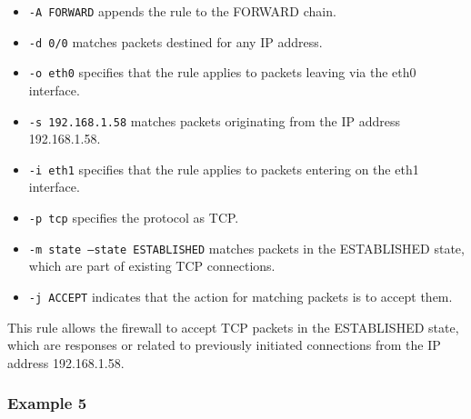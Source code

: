 {{		\begin{itemize}
			\item \texttt{-A FORWARD} appends the rule to the FORWARD chain.
			\item \texttt{-d 0/0} matches packets destined for any IP address.
			\item \texttt{-o eth0} specifies that the rule applies to packets leaving via the eth0 interface.
			\item \texttt{-s 192.168.1.58} matches packets originating from the IP address 192.168.1.58.
			\item \texttt{-i eth1} specifies that the rule applies to packets entering on the eth1 interface.
			\item \texttt{-p tcp} specifies the protocol as TCP.
			\item \texttt{-m state --state ESTABLISHED} matches packets in the ESTABLISHED state, which are part of existing TCP connections.
			\item \texttt{-j ACCEPT} indicates that the action for matching packets is to accept them.
		\end{itemize}
		
		This rule allows the firewall to accept TCP packets in the ESTABLISHED state, which are responses or related to previously initiated connections from the IP address 192.168.1.58.}
			
	\newpage		
	\subsubsection{Example 5}
	
	}
